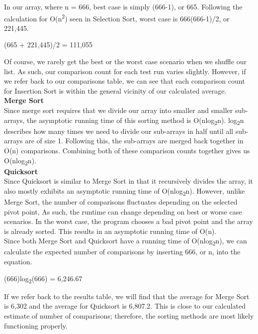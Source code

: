 \documentclass{article}
\begin{document}
In our array, where n = 666, best case is simply (666-1), or 665. Following the calculation for O(n\textsuperscript{2}) seen in Selection Sort, worst case is 666(666-1)/2, or 221,445.

\begin{center} 
(665 + 221,445)/2 = 111,055
\end{center}

Of course, we rarely get the best or the worst case scenario when we shuffle our list. As such, our comparison count for each test run varies slightly. However, if we refer back to our comparisons table, we can see that each comparison count for Insertion Sort is within the general vicinity of our calculated average.\\ 

\textbf{Merge Sort} \\
Since merge sort requires that we divide our array into smaller and smaller sub-arrays, the asymptotic running time of this sorting method is O(nlog\textsubscript{2}n). log\textsubscript{2}n describes how many times we need to divide our sub-arrays in half until all sub-arrays are of size 1. Following this, the sub-arrays are merged back together in O(n) comparisons. Combining both of these comparison counts together gives us O(nlog\textsubscript{2}n).\\

\textbf{Quicksort} \\
Since Quicksort is similar to Merge Sort in that it recursively divides the array, it also mostly exhibits an asymptotic running time of O(nlog\textsubscript{2}n). However, unlike Merge Sort, the number of comparisons fluctuates depending on the selected pivot point, As such, the runtime can change depending on best or worse case scenarios. In the worst case, the program chooses a bad pivot point and the array is already sorted. This results in an asymptotic running time of O(n). \\
Since both Merge Sort and Quicksort have a running time of O(nlog\textsubscript{2}n), we can calculate the expected number of comparisons by inserting 666, or n, into the equation.
\begin{center} 
(666)log\textsubscript{2}(666) = 6,246.67
\end{center}
If we refer back to the results table, we will find that the average for Merge Sort is 6,302 and the average for Quicksort is 6,807.2. This is close to our calculated estimate of number of comparisons; therefore, the sorting methods are most likely functioning properly. 
\end{document}
